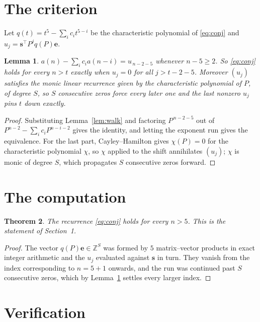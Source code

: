 \documentclass[11pt,a4paper]{article}
\theoremstyle{plain}
\newtheorem{theorem}{Theorem}
\newtheorem{lemma}[theorem]{Lemma}
\theoremstyle{definition}
\begin{document}
\section{The criterion}

Let $q(t)=t^{5}-\sum_i c_i t^{5-i}$ be the characteristic polynomial of
\eqref{eq:conj} and $u_j=\mathbf{s}^{\!\top}P^{j}q(P)\mathbf{e}$.

\begin{lemma}\label{lem:crit}
$a(n)-\sum_i c_i a(n-i)=u_{\,n-2-5}$ whenever $n-5\ge2$. So \eqref{eq:conj}
holds for every $n>t$ exactly when $u_j=0$ for all $j>t-2-5$. Moreover $(u_j)$
satisfies the monic linear recurrence given by the characteristic polynomial of $P$, of
degree $S$, so $S$ consecutive zeros force every later one and the last nonzero $u_j$ pins
$t$ down exactly.
\end{lemma}

\begin{proof}
Substituting Lemma~\ref{lem:walk} and factoring $P^{\,n-2-5}$ out of
$P^{n-2}-\sum_i c_i P^{n-i-2}$ gives the identity, and letting the exponent run gives the
equivalence. For the last part, Cayley--Hamilton gives $\chi(P)=0$ for the characteristic
polynomial $\chi$, so $\chi$ applied to the shift annihilates $(u_j)$; $\chi$ is monic of
degree $S$, which propagates $S$ consecutive zeros forward.
\end{proof}

\section{The computation}

\begin{theorem}
The recurrence \eqref{eq:conj} holds for every $n>5$. This is the statement of
Section~1.
\end{theorem}

\begin{proof}
The vector $q(P)\mathbf{e}\in\mathbb{Z}^{S}$ was formed by $5$ matrix--vector
products in exact integer arithmetic and the $u_j$ evaluated against $\mathbf{s}$ in turn.
They vanish from the index corresponding to $n=5+1$ onwards, and the run was continued
past $S$ consecutive zeros, which by Lemma~\ref{lem:crit} settles every larger index.
\end{proof}

\section{Verification}
\end{document}
